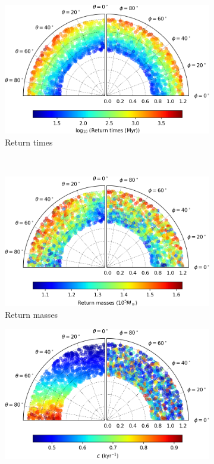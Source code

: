 \begin{figure}[h]
    \centering
    \begin{subfigure}[t]{0.4\textwidth}
        \includegraphics[width = \textwidth]{"../Files/Week 13/images/9_time"}
        \caption{Return times}
    \end{subfigure}
    ~ 
    \begin{subfigure}[t]{0.4\textwidth}
        \includegraphics[width=\textwidth]{"../Files/Week 13/images/9_mass"}
        \caption{Return masses}
    \end{subfigure}
    \begin{subfigure}[t]{0.4\textwidth}
        \includegraphics[width=\textwidth]{"../Files/Week 13/images/9_lyapunov"}

\end{subfigure}
\end{figure}
